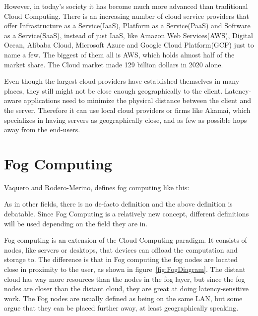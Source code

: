 However, in today's society it has become much more advanced than traditional Cloud Computing. There is an increasing number of cloud service providers that offer Infrastructure as a Service(IaaS), Platform as a Service(PaaS) and Software as a Service(SaaS), instead of just IaaS, like Amazon Web Services(AWS), Digital Ocean, Alibaba Cloud, Microsoft Azure and Google Cloud Platform(GCP) just to name a few. The biggest of them all is AWS, which holds almost half of the market share\cite{noauthor_cloud_2019}. The Cloud market made 129 billion dollars in 2020 alone\cite{noauthor_cloud_nodate}.

Even though the largest cloud providers have established themselves in many places, they still might not be close enough geographically to the client. Latency-aware applications need to minimize the physical distance between the client and the server. Therefore it can use local cloud providers or firms like Akamai, which specializes in having servers as geographically close, and as few as possible hops away from the end-users.










\section{Fog Computing}

Vaquero and Rodero-Merino\cite{vaquero_finding_2014}, defines fog computing like this: 

As in other fields, there is no de-facto definition and the above definition is debatable. Since Fog Computing is a relatively new concept, different definitions will be used depending on the field they are in.

Fog computing is an extension of the Cloud Computing paradigm. It consists of nodes, like servers or desktops, that devices can offload the computation and storage to. The difference is that in Fog computing the fog nodes are located close in proximity to the user\cite{msftadmin_concept_2020}, as shown in figure~\ref{fig:FogDiagram}. The distant cloud has way more resources than the nodes in the fog layer, but since the fog nodes are closer than the distant cloud, they are great at doing latency-sensitive work. The Fog nodes are usually defined as being on the same LAN, but some argue that they can be placed further away, at least geographically speaking. 

